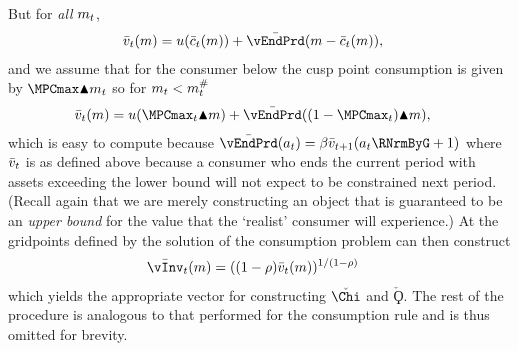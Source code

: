   But for \textit{all} $m_{t}$,
  \begin{equation*}\begin{gathered}\begin{aligned}
        \bar{\vFunc}_{\prd}(\mNrm)  & = \uFunc(\bar{\cNrm}_{\prd}(\mNrm))+ \bar{\vEndPrd}(\mNrm-\bar{\cNrm}_{\prd}(\mNrm)),
  \end{aligned}\end{gathered}\end{equation*}
  and we assume that for the consumer below the cusp point consumption is given by $\MPCmax \aboveMin \mNrm_{\prd}$ so for $m_{t}< m_{t}^{\#}$
  \begin{equation*}\begin{gathered}\begin{aligned}
        \bar{\vFunc}_{\prd}(\mNrm)  & = \uFunc( \MPCmax_{\prd} \aboveMin \mNrm)+ \bar{\vEndPrd}((1-\MPCmax_{\prd})\aboveMin \mNrm),
      \end{aligned}\end{gathered}\end{equation*}
  which is easy to compute because $\bar{\vEndPrd}(\aNrm_{\prd}) = \DiscFac \bar{\vFunc}_{\prd+1}(\aNrm_{\prd}\RNrmByG+1)$ where $\bar{v}_{t}$ is as defined above because a consumer who ends the current period with assets exceeding the lower bound will not expect to be constrained next period.  (Recall again that we are merely constructing an object that is guaranteed to be an \textit{upper bound} for the value that the `realist' consumer will experience.)  At the gridpoints defined by the solution of the consumption problem can then construct
  \begin{equation*}\begin{gathered}\begin{aligned}
        \bar{\vInv}_{\prd}(\mNrm)  & = ((1-\CRRA)\bar{\vFunc}_{\prd}(\mNrm))^{1/(1-\CRRA)}
      \end{aligned}\end{gathered}\end{equation*}
 which yields the appropriate vector for constructing $\check{\Chi}$ and $\check{\Koppa}$.  The rest of the procedure is analogous to that performed for the consumption rule and is thus omitted for brevity.

